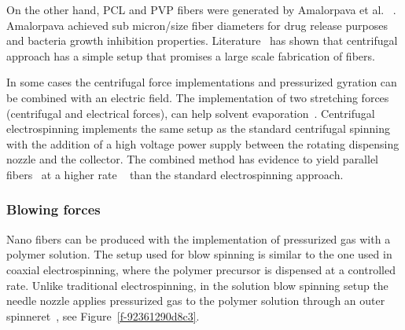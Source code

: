 \documentclass[5p,,preprint,12pt,twocolumn]{elsarticle}
\begin{document}
On the other hand, PCL and PVP fibers were generated by Amalorpava et al. \unskip~\cite{527120:13536089}.  Amalorpava achieved sub micron/size fiber diameters for drug release purposes and bacteria growth inhibition properties. Literature\unskip~\cite{527120:13536446} has shown that centrifugal approach has a simple setup that promises a large scale fabrication of fibers.

In some cases the centrifugal force implementations and pressurized gyration can be combined with an electric field. The implementation of two stretching forces (centrifugal and electrical forces), can help solvent evaporation\unskip~\cite{527120:13536560}. Centrifugal electrospinning implements the same setup as the standard centrifugal spinning with the addition of a high voltage power supply between the rotating dispensing nozzle and the collector. The combined method has evidence to yield parallel fibers\unskip~\cite{527120:13536841,527120:13536900,527120:13537392,527120:13537393} at a higher rate \unskip~\cite{527120:13536841,527120:13536900} than the standard electrospinning approach.



\subsubsection{Blowing forces}Nano fibers can be produced with the implementation of pressurized gas with a polymer solution. The setup used for blow spinning is similar to the one used in coaxial electrospinning, where the polymer precursor is dispensed at a controlled rate. Unlike traditional electrospinning, in the solution blow spinning setup the needle nozzle applies pressurized gas to the polymer solution through an outer spinneret\unskip~\cite{527120:13538056}, see Figure~\ref{f-92361290d8c3}. 
\end{document}
